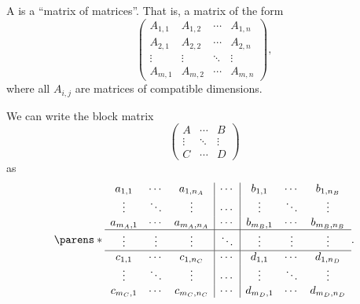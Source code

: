 \begin{definition}\label{def:block_matrix}
  A  is a \enquote{matrix of matrices}. That is, a matrix of the form
  \begin{equation*}
    \begin{pmatrix}
      A_{1,1} & A_{1,2} & \cdots & A_{1,n} \\
      A_{2,1} & A_{2,2} & \cdots & A_{2,n} \\
      \vdots  & \vdots  & \ddots & \vdots  \\
      A_{m,1} & A_{m,2} & \cdots & A_{m,n}
    \end{pmatrix},
  \end{equation*}
  where all \( A_{i,j} \) are matrices of compatible dimensions.

  We can write the block matrix
  \begin{equation*}
    \begin{pmatrix}
      A      & \cdots & B      \\
      \vdots & \ddots & \vdots \\
      C      & \cdots & D
    \end{pmatrix}
  \end{equation*}
  as
  \begin{equation*}
    \parens*
      {
        \begin{array}{ccc|c|ccc}
          a_{1,1}   & \cdots & a_{1,n_A}   & \cdots & b_{1,1}   & \cdots & b_{1,n_B} \\
          \vdots    & \ddots & \vdots      & \cdots & \vdots    & \ddots & \vdots \\
          a_{m_A,1} & \cdots & a_{m_A,n_A} & \cdots & b_{m_B,1} & \cdots & b_{m_B,n_B} \\
          \hline
          \vdots    & \vdots & \vdots      & \ddots & \vdots    & \vdots & \vdots \\
          \hline
          c_{1,1}   & \cdots & c_{1,n_C}   & \cdots & d_{1,1}   & \cdots & d_{1,n_D} \\
          \vdots    & \ddots & \vdots      & \cdots & \vdots    & \ddots & \vdots \\
          c_{m_C,1} & \cdots & c_{m_C,n_C} & \cdots & d_{m_D,1} & \cdots & d_{m_D,n_D} \\
        \end{array}
      }.
  \end{equation*}


\end{definition}
